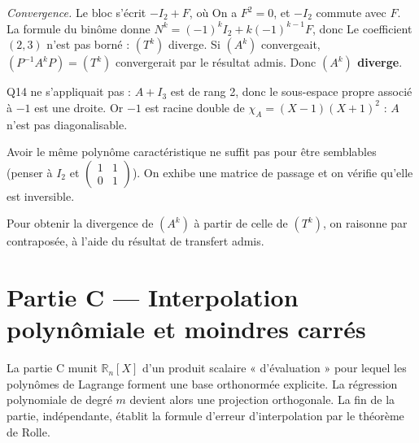 \documentclass[11pt,a4paper]{article}
\newcommand{\equationajustee}[1]{%
  \sbox{\boiteequation}{$\displaystyle #1$}%
  \ifdim\wd\boiteequation>\linewidth
    \[\resizebox{\linewidth}{!}{\usebox{\boiteequation}}\]%
  \else
    \[#1\]%
  \fi}
\begin{document}
\emph{Convergence.} Le bloc
\equationajustee{N=\begin{pmatrix}-1&1\\0&-1\end{pmatrix}}
s'écrit \(-I_2+F\), où
\equationajustee{F=\begin{pmatrix}0&1\\0&0\end{pmatrix}.}
On a \(F^2=0\), et \(-I_2\) commute avec \(F\). La formule du binôme donne \(N^k=(-1)^kI_2+k(-1)^{k-1}F\), donc
\equationajustee{T^k=\begin{pmatrix}1&0&0\\0&(-1)^k&(-1)^{k-1}k\\0&0&(-1)^k\end{pmatrix}.}
Le coefficient \((2,3)\) n'est pas borné : \((T^k)\) diverge. Si \((A^k)\) convergeait, \((P^{-1}A^kP)=(T^k)\) convergerait par le résultat admis. Donc \textbf{\((A^k)\) diverge}.

Q14 ne s'appliquait pas : \(A+I_3\) est de rang 2, donc le sous-espace propre associé à \(-1\) est une droite. Or \(-1\) est racine double de \(\chi_A=(X-1)(X+1)^2\) : \(A\) n'est pas diagonalisable.

\begin{piege}

Avoir le même polynôme caractéristique ne suffit pas pour être semblables (penser à \(I_2\) et \(\begin{pmatrix}1&1\\0&1\end{pmatrix}\)). On exhibe une matrice de passage et on vérifie qu'elle est inversible.

\end{piege}

\begin{methode}

Pour obtenir la divergence de \((A^k)\) à partir de celle de \((T^k)\), on raisonne par contraposée, à l'aide du résultat de transfert admis.

\end{methode}

\hypertarget{partie-c-interpolation-polynuxf4miale-et-moindres-carruxe9s}{%
\section{Partie C --- Interpolation polynômiale et moindres carrés}\label{partie-c-interpolation-polynuxf4miale-et-moindres-carruxe9s}}

La partie C munit \(\mathbb R_n[X]\) d'un produit scalaire « d'évaluation » pour lequel les polynômes de Lagrange forment une base orthonormée explicite. La régression polynomiale de degré \(m\) devient alors une projection orthogonale. La fin de la partie, indépendante, établit la formule d'erreur d'interpolation par le théorème de Rolle.
\end{document}
